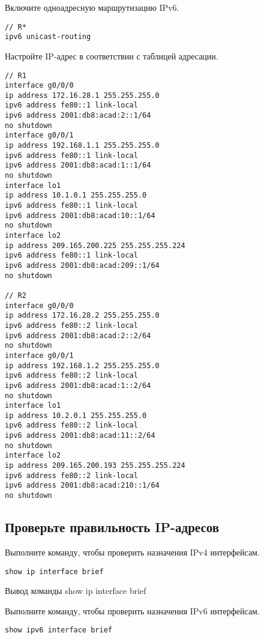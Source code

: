 Включите одноадресную маршрутизацию IPv6.

\begin{verbatim}
// R*
ipv6 unicast-routing
\end{verbatim}

Настройте IP-адрес в соответствии с таблицей адресации.

\begin{verbatim}
// R1
interface g0/0/0
ip address 172.16.28.1 255.255.255.0
ipv6 address fe80::1 link-local
ipv6 address 2001:db8:acad:2::1/64
no shutdown
interface g0/0/1
ip address 192.168.1.1 255.255.255.0
ipv6 address fe80::1 link-local
ipv6 address 2001:db8:acad:1::1/64
no shutdown
interface lo1
ip address 10.1.0.1 255.255.255.0
ipv6 address fe80::1 link-local
ipv6 address 2001:db8:acad:10::1/64
no shutdown
interface lo2
ip address 209.165.200.225 255.255.255.224
ipv6 address fe80::1 link-local
ipv6 address 2001:db8:acad:209::1/64
no shutdown

// R2
interface g0/0/0
ip address 172.16.28.2 255.255.255.0
ipv6 address fe80::2 link-local
ipv6 address 2001:db8:acad:2::2/64
no shutdown
interface g0/0/1
ip address 192.168.1.2 255.255.255.0
ipv6 address fe80::2 link-local
ipv6 address 2001:db8:acad:1::2/64
no shutdown
interface lo1
ip address 10.2.0.1 255.255.255.0
ipv6 address fe80::2 link-local
ipv6 address 2001:db8:acad:11::2/64
no shutdown
interface lo2
ip address 209.165.200.193 255.255.255.224
ipv6 address fe80::2 link-local
ipv6 address 2001:db8:acad:210::1/64
no shutdown
\end{verbatim}

\subsection{Проверьте правильность IP-адресов}

Выполните команду, чтобы проверить назначения IPv4 интерфейсам.

\begin{verbatim}
show ip interface brief
\end{verbatim}

\begin{image}
    \caption{Вывод команды show ip interface brief}
\end{image}

Выполните команду, чтобы проверить назначения IPv6 интерфейсам.

\begin{verbatim}
show ipv6 interface brief
\end{verbatim}

